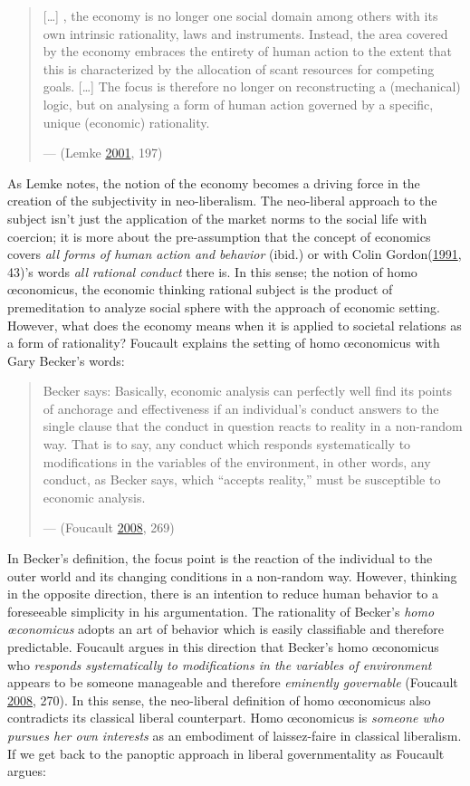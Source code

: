 \documentclass[12pt,twoside]{report}
\begin{document}
\begin{quote}
{[}\ldots{}{]} , the economy is no longer one social domain among others with its own intrinsic rationality, laws and instruments. Instead, the area covered by the economy embraces the entirety of human action to the extent that this is characterized by the allocation of scant resources for competing goals. {[}\ldots{}{]} The focus is therefore no longer on reconstructing a (mechanical) logic, but on analysing a form of human action governed by a specific, unique (economic) rationality.

--- (Lemke \protect\hyperlink{ref-Lemke2001}{2001}, 197)
\end{quote}

As Lemke notes, the notion of the economy becomes a driving force in the creation of the subjectivity in neo-liberalism. The neo-liberal approach to the subject isn't just the application of the market norms to the social life with coercion; it is more about the pre-assumption that the concept of economics covers \emph{all forms of human action and behavior} (ibid.) or with Colin Gordon(\protect\hyperlink{ref-Gordon1991}{1991}, 43)'s words \emph{all rational conduct} there is. In this sense; the notion of homo œconomicus, the economic thinking rational subject is the product of premeditation to analyze social sphere with the approach of economic setting. However, what does the economy means when it is applied to societal relations as a form of rationality? Foucault explains the setting of homo œconomicus with Gary Becker's words:

\begin{quote}
Becker says: Basically, economic analysis can perfectly well find its points of anchorage and effectiveness if an individual's conduct answers to the single clause that the conduct in question reacts to reality in a non-random way. That is to say, any conduct which responds systematically to modifications in the variables of the environment, in other words, any conduct, as Becker says, which ``accepts reality,'' must be susceptible to economic analysis.

--- (Foucault \protect\hyperlink{ref-Foucault2008}{2008}, 269)
\end{quote}

In Becker's definition, the focus point is the reaction of the individual to the outer world and its changing conditions in a non-random way. However, thinking in the opposite direction, there is an intention to reduce human behavior to a foreseeable simplicity in his argumentation. The rationality of Becker's \emph{homo œconomicus} adopts an art of behavior which is easily classifiable and therefore predictable. Foucault argues in this direction that Becker's homo œconomicus who \emph{responds systematically to modifications in the variables of environment} appears to be someone manageable and therefore \emph{eminently governable} (Foucault \protect\hyperlink{ref-Foucault2008}{2008}, 270). In this sense, the neo-liberal definition of homo œconomicus also contradicts its classical liberal counterpart. Homo œconomicus is \emph{someone who pursues her own interests} as an embodiment of laissez-faire in classical liberalism. If we get back to the panoptic approach in liberal governmentality as Foucault argues:
\end{document}
